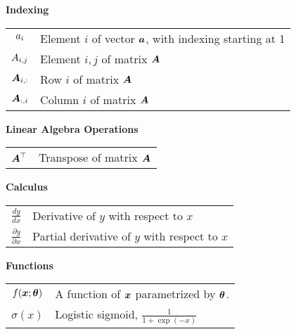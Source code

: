 \vspace{\notationgap}
\begin{minipage}{\textwidth}
	\centerline{\bf Indexing}
	\bgroup
	\def\arraystretch{1.5}
	\begin{tabular}{cp{3.25in}}
		$\displaystyle {a}_i$ & Element $i$ of vector ${\bm{a}}$, with indexing starting at 1 \\
		$\displaystyle {A}_{i,j}$ & Element $i, j$ of matrix ${\bm{A}}$ \\
		$\displaystyle {\bm{A}}_{i, :}$ & Row $i$ of matrix ${\bm{A}}$ \\
		$\displaystyle {\bm{A}}_{:, i}$ & Column $i$ of matrix ${\bm{A}}$ \\
	\end{tabular}
	\egroup
\end{minipage}

\vspace{\notationgap}
\begin{minipage}{\textwidth}
	\centerline{\bf Linear Algebra Operations}
	\bgroup
	\def\arraystretch{1.5}
	\begin{tabular}{cp{3.25in}}
		$\displaystyle {\bm{A}}^\top$ & Transpose of matrix ${\bm{A}}$ \\
	\end{tabular}
	\egroup
\end{minipage}

\vspace{\notationgap}
\begin{minipage}{\textwidth}
	\centerline{\bf Calculus}
	\bgroup
	\def\arraystretch{1.5}
	\begin{tabular}{cp{3.25in}}
		$\displaystyle\frac{d y} {d x}$ & Derivative of $y$ with respect to $x$\\ [2ex]
		$\displaystyle \frac{\partial y} {\partial x} $ & Partial derivative of $y$ with respect to $x$ \\
	\end{tabular}
	\egroup
\end{minipage}

\vspace{\notationgap}
\begin{minipage}{\textwidth}
	\centerline{\bf Functions}
	\bgroup
	\def\arraystretch{1.5}
	\begin{tabular}{cp{3.25in}}
		$\displaystyle f({\bm{x}} ; {\bm{\theta}}) $ & A function of ${\bm{x}}$ parametrized by ${\bm{\theta}}$. \\
		$\displaystyle \sigma(x)$ & Logistic sigmoid, $\displaystyle \frac{1} {1 + \exp(-x)}$ \\
	\end{tabular}
	\egroup
\end{minipage}

